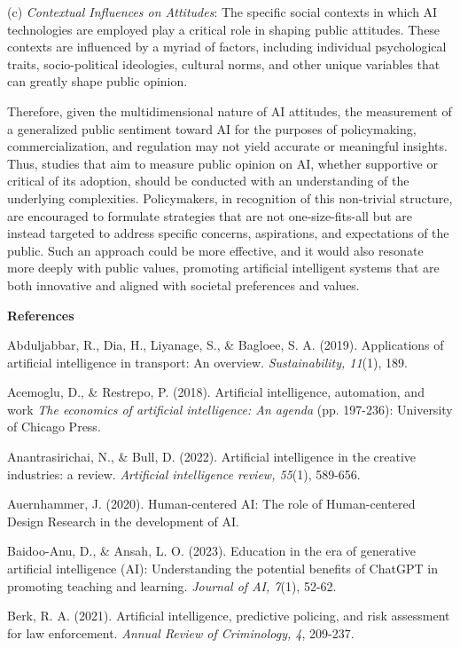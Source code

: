 (c) \textit{Contextual Influences on Attitudes}: The specific social contexts in which AI technologies are employed play a critical role in shaping public attitudes. These contexts are influenced by a myriad of factors, including individual psychological traits, socio-political ideologies, cultural norms, and other unique variables that can greatly shape public opinion.

Therefore, given the multidimensional nature of AI attitudes, the measurement of a generalized public sentiment toward AI for the purposes of policymaking, commercialization, and regulation may not yield accurate or meaningful insights. Thus, studies that aim to measure public opinion on AI, whether supportive or critical of its adoption, should be conducted with an understanding of the underlying complexities. Policymakers, in recognition of this non-trivial structure, are encouraged to formulate strategies that are not one-size-fits-all but are instead targeted to address specific concerns, aspirations, and expectations of the public. Such an approach could be more effective, and it would also resonate more deeply with public values, promoting artificial intelligent systems that are both innovative and aligned with societal preferences and values.

\textbf{References}

Abduljabbar, R., Dia, H., Liyanage, S., \& Bagloee, S. A. (2019). Applications of artificial intelligence in transport: An overview. \textit{Sustainability, 11}(1), 189.

Acemoglu, D., \& Restrepo, P. (2018). Artificial intelligence, automation, and work \textit{The economics of artificial intelligence: An agenda} (pp. 197-236): University of Chicago Press.

Anantrasirichai, N., \& Bull, D. (2022). Artificial intelligence in the creative industries: a review. \textit{Artificial intelligence review, 55}(1), 589-656.

Auernhammer, J. (2020). Human-centered AI: The role of Human-centered Design Research in the development of AI.

Baidoo-Anu, D., \& Ansah, L. O. (2023). Education in the era of generative artificial intelligence (AI): Understanding the potential benefits of ChatGPT in promoting teaching and learning. \textit{Journal of AI, 7}(1), 52-62.

Berk, R. A. (2021). Artificial intelligence, predictive policing, and risk assessment for law enforcement. \textit{Annual Review of Criminology, 4}, 209-237.


